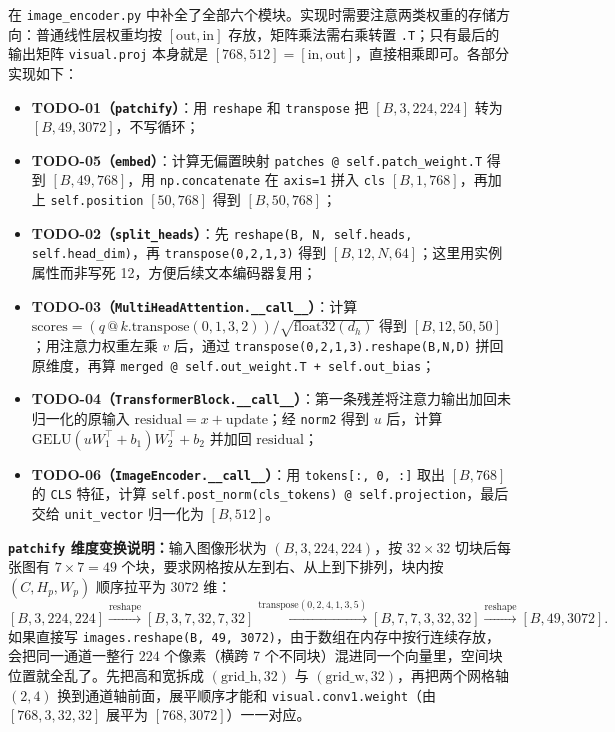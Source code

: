 \documentclass[a4paper,11pt]{article}
\newcommand{\mywork}[1]{\textcolor{myred}{\textbf{#1}}}
\begin{document}
在 \texttt{image\_encoder.py} 中补全了全部六个模块。实现时需要注意两类权重的存储方向：普通线性层权重均按 $[\text{out},\text{in}]$ 存放，矩阵乘法需右乘转置 \texttt{.T}；只有最后的输出矩阵 \texttt{visual.proj} 本身就是 $[768,512]=[\text{in},\text{out}]$，直接相乘即可。各部分实现如下：
\begin{itemize}
    \item \mywork{TODO-01（\texttt{patchify}）}：用 \texttt{reshape} 和 \texttt{transpose} 把 $[B,3,224,224]$ 转为 $[B,49,3072]$，不写循环；
    \item \mywork{TODO-05（\texttt{embed}）}：计算无偏置映射 \texttt{patches @ self.patch\_weight.T} 得到 $[B,49,768]$，用 \texttt{np.concatenate} 在 \texttt{axis=1} 拼入 \texttt{cls} $[B,1,768]$，再加上 \texttt{self.position} $[50,768]$ 得到 $[B,50,768]$；
    \item \mywork{TODO-02（\texttt{split\_heads}）}：先 \texttt{reshape(B, N, self.heads, self.head\_dim)}，再 \texttt{transpose(0,2,1,3)} 得到 $[B,12,N,64]$；这里用实例属性而非写死 12，方便后续文本编码器复用；
    \item \mywork{TODO-03（\texttt{MultiHeadAttention.\_\_call\_\_}）}：计算 $\text{scores} = (q \mathbin{@} k.\text{transpose}(0,1,3,2)) / \sqrt{\text{float32}(d_h)}$ 得到 $[B,12,50,50]$；用注意力权重左乘 $v$ 后，通过 \texttt{transpose(0,2,1,3).reshape(B,N,D)} 拼回原维度，再算 \texttt{merged @ self.out\_weight.T + self.out\_bias}；
    \item \mywork{TODO-04（\texttt{TransformerBlock.\_\_call\_\_}）}：第一条残差将注意力输出加回未归一化的原输入 $\text{residual} = x + \text{update}$；经 \texttt{norm2} 得到 $u$ 后，计算 $\text{GELU}(u W_1^\top + b_1) W_2^\top + b_2$ 并加回 $\text{residual}$；
    \item \mywork{TODO-06（\texttt{ImageEncoder.\_\_call\_\_}）}：用 \texttt{tokens[:, 0, :]} 取出 $[B,768]$ 的 \texttt{CLS} 特征，计算 \texttt{self.post\_norm(cls\_tokens) @ self.projection}，最后交给 \texttt{unit\_vector} 归一化为 $[B,512]$。
\end{itemize}

\noindent\textbf{\texttt{patchify} 维度变换说明：}输入图像形状为 $(B,3,224,224)$，按 $32\times 32$ 切块后每张图有 $7\times 7=49$ 个块，要求网格按从左到右、从上到下排列，块内按 $(C, H_p, W_p)$ 顺序拉平为 $3072$ 维：
\[
[B,3,224,224] \xrightarrow{\text{reshape}} [B,3,7,32,7,32] \xrightarrow{\text{transpose}(0,2,4,1,3,5)} [B,7,7,3,32,32] \xrightarrow{\text{reshape}} [B,49,3072].
\]
如果直接写 \texttt{images.reshape(B, 49, 3072)}，由于数组在内存中按行连续存放，会把同一通道一整行 $224$ 个像素（横跨 7 个不同块）混进同一个向量里，空间块位置就全乱了。先把高和宽拆成 $(\text{grid\_h},32)$ 与 $(\text{grid\_w},32)$，再把两个网格轴 $(2,4)$ 换到通道轴前面，展平顺序才能和 \texttt{visual.conv1.weight}（由 $[768,3,32,32]$ 展平为 $[768,3072]$）一一对应。
\end{document}

